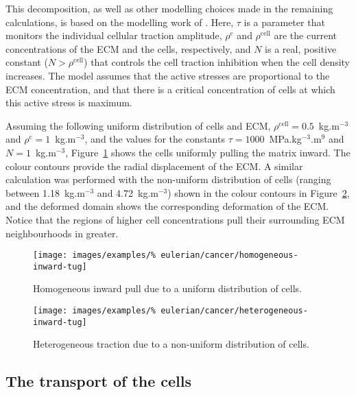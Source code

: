 \noindent This decomposition, as well as other modelling choices made
in the remaining calculations, is based on the modelling work of
\citet{namyetal:04}. Here, $\tau$ is a parameter that monitors the
individual cellular traction amplitude, $\rho^{\mathrm{c}}$ and
$\rho^{\mathrm{cell}}$ are the current concentrations of the ECM and
the cells, respectively, and $N$ is a real, positive constant
($N>\rho^{\mathrm{cell}}$) that controls the cell traction inhibition
when the cell density increases. The model assumes that the active
stresses are proportional to the ECM concentration, and that there is
a critical concentration of cells at which this active stress is
maximum.

Assuming the following uniform distribution of cells and ECM,
$\rho^{\mathrm{cell}}=0.5$~kg.m$^{-3}$ and
$\rho^{\mathrm{c}}=1$~kg.m$^{-3}$, and the values for the constants
$\tau=1000$~MPa.kg$^{-3}$.m$^{9}$ and $N=1$~kg.m$^{-3}$,
Figure~\ref{tumour-homogeneous-inward-tug} shows the cells uniformly
pulling the matrix inward. The colour contours provide the radial
displacement of the ECM. A similar calculation was performed with the
non-uniform distribution of cells (ranging between 1.18~kg.m$^{-3}$
and 4.72~kg.m$^{-3}$) shown in the colour contours in
Figure~\ref{tumour-heterogeneous-inward-tug}, and the deformed domain
shows the corresponding deformation of the ECM. Notice that the
regions of higher cell concentrations pull their surrounding ECM
neighbourhoods in greater.

\begin{figure}[!hptb]
  \centering
  \texttt{[image: images/examples/\%
    eulerian/cancer/homogeneous-inward-tug]}
  \caption{Homogeneous inward pull due to a uniform distribution of
    cells.}
  \label{tumour-homogeneous-inward-tug}
\end{figure}

\begin{figure}[!hptb]
  \centering
  \texttt{[image: images/examples/\%
    eulerian/cancer/heterogeneous-inward-tug]}
  \caption{Heterogeneous traction due to a non-uniform distribution of
    cells.}
  \label{tumour-heterogeneous-inward-tug}
\end{figure}

\clearpage

\subsection{The transport of the cells}
\label{cell-transport}

